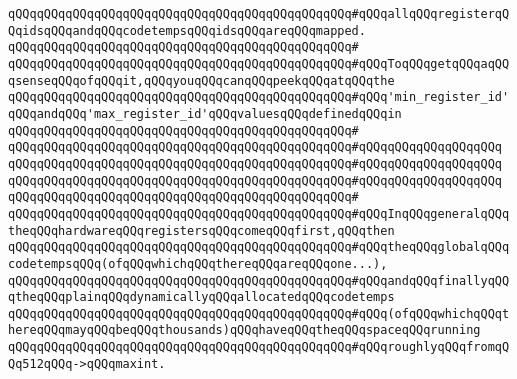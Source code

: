 \verb|qQQqqQQqqQQqqQQqqQQqqQQqqQQqqQQqqQQqqQQqqQQqqQQq#qQQqallqQQqregisterqQQqidsqQQqandqQQqcodetempsqQQqidsqQQqareqQQqmapped.|\newline
\verb|qQQqqQQqqQQqqQQqqQQqqQQqqQQqqQQqqQQqqQQqqQQqqQQq#|\newline
\verb|qQQqqQQqqQQqqQQqqQQqqQQqqQQqqQQqqQQqqQQqqQQqqQQq#qQQqToqQQqgetqQQqaqQQqsenseqQQqofqQQqit,qQQqyouqQQqcanqQQqpeekqQQqatqQQqthe|\newline
\verb|qQQqqQQqqQQqqQQqqQQqqQQqqQQqqQQqqQQqqQQqqQQqqQQq#qQQq'min_register_id'qQQqandqQQq'max_register_id'qQQqvaluesqQQqdefinedqQQqin|\newline
\verb|qQQqqQQqqQQqqQQqqQQqqQQqqQQqqQQqqQQqqQQqqQQqqQQq#|\newline
\verb|qQQqqQQqqQQqqQQqqQQqqQQqqQQqqQQqqQQqqQQqqQQqqQQq#qQQqqQQqqQQqqQQqqQQq|\newline
\verb|qQQqqQQqqQQqqQQqqQQqqQQqqQQqqQQqqQQqqQQqqQQqqQQq#qQQqqQQqqQQqqQQqqQQq|\newline
\verb|qQQqqQQqqQQqqQQqqQQqqQQqqQQqqQQqqQQqqQQqqQQqqQQq#qQQqqQQqqQQqqQQqqQQq|\newline
\verb|qQQqqQQqqQQqqQQqqQQqqQQqqQQqqQQqqQQqqQQqqQQqqQQq#|\newline
\verb|qQQqqQQqqQQqqQQqqQQqqQQqqQQqqQQqqQQqqQQqqQQqqQQq#qQQqInqQQqgeneralqQQqtheqQQqhardwareqQQqregistersqQQqcomeqQQqfirst,qQQqthen|\newline
\verb|qQQqqQQqqQQqqQQqqQQqqQQqqQQqqQQqqQQqqQQqqQQqqQQq#qQQqtheqQQqglobalqQQqcodetempsqQQq(ofqQQqwhichqQQqthereqQQqareqQQqone...),|\newline
\verb|qQQqqQQqqQQqqQQqqQQqqQQqqQQqqQQqqQQqqQQqqQQqqQQq#qQQqandqQQqfinallyqQQqtheqQQqplainqQQqdynamicallyqQQqallocatedqQQqcodetemps|\newline
\verb|qQQqqQQqqQQqqQQqqQQqqQQqqQQqqQQqqQQqqQQqqQQqqQQq#qQQq(ofqQQqwhichqQQqthereqQQqmayqQQqbeqQQqthousands)qQQqhaveqQQqtheqQQqspaceqQQqrunning|\newline
\verb|qQQqqQQqqQQqqQQqqQQqqQQqqQQqqQQqqQQqqQQqqQQqqQQq#qQQqroughlyqQQqfromqQQq512qQQq->qQQqmaxint.|\newline
